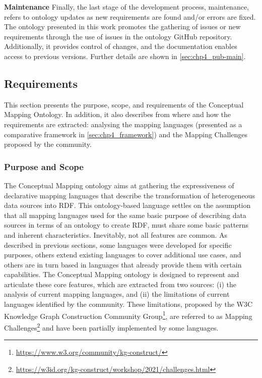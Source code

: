 \noindent\textbf{Maintenance}
Finally, the last stage of the development process, maintenance, refers to ontology updates as new requirements are found and/or errors are fixed. The ontology presented in this work promotes the gathering of issues or new requirements through the use of issues in the ontology GitHub repository. Additionally, it provides control of changes, and the documentation enables access to previous versions. Further details are shown in \cref{sec:chp4_pub-main}.



\subsection{Requirements}
\label{sec:chp4_requirements}
This section presents the purpose, scope, and requirements of the Conceptual Mapping Ontology. In addition, it also describes from where and how the requirements are extracted: analysing the mapping languages (presented as a comparative framework in \cref{sec:chp4_framework}) and the Mapping Challenges proposed by the community.

\subsubsection{Purpose and Scope}

The Conceptual Mapping ontology aims at gathering the expressiveness of declarative mapping languages that describe the transformation of heterogeneous data sources into RDF. This ontology-based language settles on the assumption that all mapping languages used for the same basic purpose of describing data sources in terms of an ontology to create RDF, must share some basic patterns and inherent characteristics. Inevitably, not all features are common. As described in previous sections, some languages were developed for specific purposes, others extend existing languages to cover additional use cases, and others are in turn based in languages that already provide them with certain capabilities. The Conceptual Mapping ontology is designed to represent and articulate these core features, which are extracted from two sources: (i) the analysis of current mapping languages, and (ii) the limitations of current languages identified by the community. These limitations, proposed by the W3C Knowledge Graph Construction Community Group\footnote{\label{foot:kgc}\url{https://www.w3.org/community/kg-construct/}}, are referred to as Mapping Challenges\footnote{\label{foot:challenges}\url{https://w3id.org/kg-construct/workshop/2021/challenges.html}} and have been partially implemented by some languages. %

